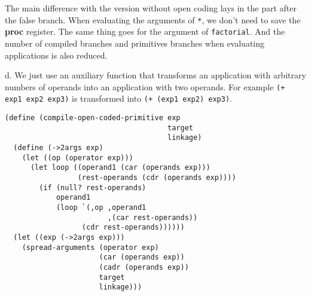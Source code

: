 \documentclass[a4paper,12pt]{article}
\newcommand{\subpar}[1]{\medskip \noindent #1.}
\begin{document}
The main difference with the version without open coding lays in the
part after the false branch.  When evaluating the arguments of
\lstinline!*!, we don't need to save the \textbf{proc} register.  The
same thing goes for the argument of \lstinline!factorial!.  And the
number of compiled branches and primitives branches when evaluating
applications is also reduced.

\subpar{d} We just use an auxiliary function that transforms an
application with arbitrary numbers of operands into an application
with two operands.  For example \lstinline!(+ exp1 exp2 exp3)!  is
transformed into \lstinline!(+ (exp1 exp2) exp3)!.

\begin{lstlisting}
(define (compile-open-coded-primitive exp
                                      target
                                      linkage)
  (define (->2args exp)
    (let ((op (operator exp)))
      (let loop ((operand1 (car (operands exp)))
                 (rest-operands (cdr (operands exp))))
        (if (null? rest-operands)
            operand1
            (loop `(,op ,operand1
                        ,(car rest-operands))
                  (cdr rest-operands))))))
  (let ((exp (->2args exp)))
    (spread-arguments (operator exp)
                      (car (operands exp))
                      (cadr (operands exp))
                      target
                      linkage)))
\end{lstlisting}
\end{document}
